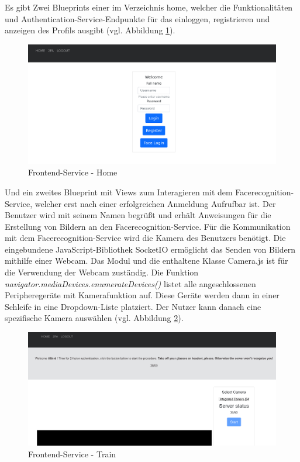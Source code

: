 Es gibt Zwei Blueprints einer im Verzeichnis home, welcher die Funktionalitäten und Authentication-Service-Endpunkte für das einloggen, registrieren und anzeigen des Profils ausgibt (vgl. Abbildung \ref{fig:kubevision_home}).

\begin{figure}[!htb]
  \centering
  \includegraphics[width=1.0\columnwidth]{images/kubevision_home.png}
  \caption{Frontend-Service - Home}
  \label{fig:kubevision_home}
\end{figure}

Und ein zweites Blueprint mit Views zum Interagieren mit dem Facerecognition-Service, welcher erst nach einer erfolgreichen Anmeldung Aufrufbar ist.
Der Benutzer wird mit seinem Namen begrüßt und erhält Anweisungen für die Erstellung von Bildern an den Facerecognition-Service.
Für die Kommunikation mit dem Facerecognition-Service wird die Kamera des Benutzers benötigt.
Die eingebundene JavaScript-Bibliothek SocketIO ermöglicht das Senden von Bildern mithilfe einer Webcam.
Das Modul und die enthaltene Klasse Camera.js ist für die Verwendung der Webcam zuständig.
Die Funktion \textit{navigator.mediaDevices.enumerateDevices()} listet alle angeschlossenen Peripheregeräte mit Kamerafunktion auf.
Diese Geräte werden dann in einer Schleife in eine Dropdown-Liste platziert.
Der Nutzer kann danach eine spezifische Kamera auswählen (vgl. Abbildung \ref{fig:kubevision_train}).

\begin{figure}[!htb]
  \centering
  \includegraphics[width=1.0\columnwidth]{images/Frontend-Service-train.png}
  \caption{Frontend-Service - Train}
  \label{fig:kubevision_train}
\end{figure}



